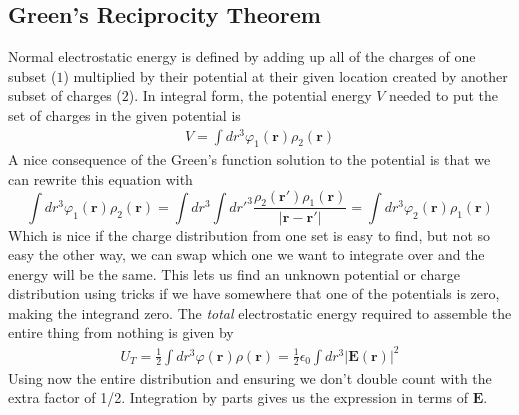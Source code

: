 \subsection{Green's Reciprocity Theorem}
Normal electrostatic energy is defined by adding up all of the charges of one subset ($1$) multiplied by their potential at their given location created by another subset of charges ($2$). In integral form, the potential energy $V$ needed to put the set of charges in the given potential is
\begin{align}
V = \int dr^3 \varphi_1(\textbf{r})\rho_2(\textbf{r}) 
\end{align}
A nice consequence of the Green's function solution to the potential is that we can rewrite this equation with
\begin{equation}
\int dr^3 \varphi_1(\textbf{r})\rho_2(\textbf{r}) = \int dr^3 \int dr'^3 \frac{\rho_2(\textbf{r}')\rho_1(\textbf{r})} {|\textbf{r}-\textbf{r}'|} = \int dr^3 \varphi_2(\textbf{r})\rho_1(\textbf{r}) 
\end{equation}
Which is nice if the charge distribution from one set is easy to find, but not so easy the other way, we can swap which one we want to integrate over and the energy will be the same. This lets us find an unknown potential or charge distribution using tricks if we have somewhere that one of the potentials is zero, making the integrand zero. The \emph{total} electrostatic energy required to assemble the entire thing from nothing is given by
\begin{align}
U_T = \frac{1}{2} \int dr^3 \varphi (\textbf{r})\rho(\textbf{r}) = \frac{1}{2}\epsilon_0\int dr^3 |\textbf{E}(\textbf{r})|^2
\end{align}
Using now the entire distribution and ensuring we don't double count with the extra factor of 1/2. Integration by parts gives us the expression in terms of $\textbf{E}$.



